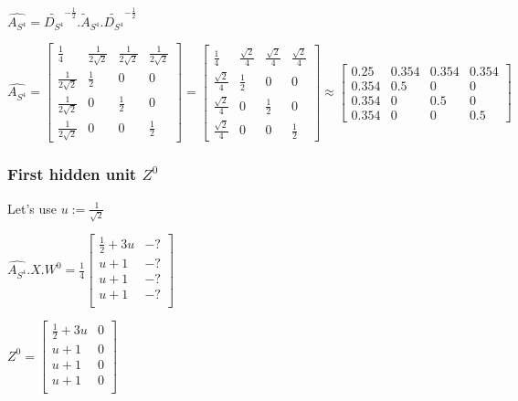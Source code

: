 \documentclass[a4paper]{article}
\begin{document}
$\hat{A_{S^4}} = \tilde{D_{S^4}}^{-\frac{1}{2}} .\tilde{A}_{S^4} .\tilde{D_{S^4}}^{-\frac{1}{2}} $





$\hat{A_{S^4}} = \begin{bmatrix}
    \frac{1}{4} &  \frac{1}{2\sqrt{2}}  &  \frac{1}{2\sqrt{2}}  &  \frac{1}{2\sqrt{2}} \\
    \frac{1}{2\sqrt{2}}  &  \frac{1}{2}  &  0 &  0\\
    \frac{1}{2\sqrt{2}}  &  0 &  \frac{1}{2}  &  0\\
    \frac{1}{2\sqrt{2}}  &  0 &  0 &  \frac{1}{2} 
\end{bmatrix} =
\left[\begin{matrix}\frac{1}{4} & \frac{\sqrt{2}}{4} & \frac{\sqrt{2}}{4} & \frac{\sqrt{2}}{4}\\\frac{\sqrt{2}}{4} & \frac{1}{2} & 0 & 0\\\frac{\sqrt{2}}{4} & 0 & \frac{1}{2} & 0\\\frac{\sqrt{2}}{4} & 0 & 0 & \frac{1}{2}\end{matrix}\right]
\approx \begin{bmatrix}
    0.25 &  0.354 &  0.354 &  0.354\\
    0.354 &  0.5 &  0 &  0\\
    0.354 &  0 &  0.5 &  0\\
    0.354 &  0 &  0 &  0.5
\end{bmatrix}
$

\subsubsection*{First hidden unit $Z^{0}$}

Let's use $u := \frac{1}{\sqrt{2}}$

$\hat{A_{S^4}}.X. W^{0} = \frac{1}{4}\begin{bmatrix}
    \frac{1}{2} + 3u &  -? \\
    u+1 &  -? \\
    u+1 &  -? \\
    u+1 &  -? \\
\end{bmatrix}$

$Z^{0} = \begin{bmatrix}
    \frac{1}{2} + 3u & 0 \\
    u+1 &  0 \\
    u+1 &  0 \\
    u+1 &  0 \\
\end{bmatrix}
$
\end{document}
